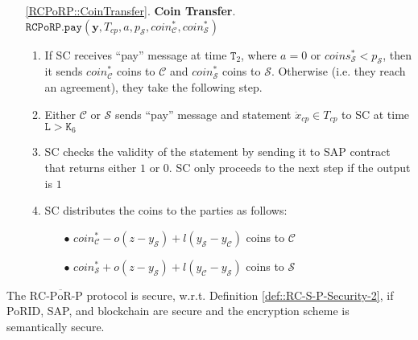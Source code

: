 \begin{enumerate}
\item[\ref{RCPoRP::CoinTransfer}.] \textbf{Coin Transfer}. \label{RCPoRP::CoinTransfer2} $\mathtt{\mathtt{RCPoRP}}.\mathtt{pay}(\bm{y},T_{\scriptscriptstyle cp},a,p_{\scriptscriptstyle\mathcal S}, coin^{\scriptscriptstyle *}_{\scriptscriptstyle\mathcal C},coin^{\scriptscriptstyle *}_{\scriptscriptstyle\mathcal S})$
\begin{enumerate}


 \item If SC  receives  ``pay'' message  at time $\texttt{T}_{\scriptscriptstyle 2}$, where $a=0$ or $coins^{\scriptscriptstyle *}_{\scriptscriptstyle\mathcal{S}}<p_{\scriptscriptstyle\mathcal{S}}$, then it sends $coin^{\scriptscriptstyle *}_{\scriptscriptstyle\mathcal C}$ coins to $\mathcal C$ and $coin^{\scriptscriptstyle *}_{\scriptscriptstyle\mathcal S}$ coins to $\mathcal S$. Otherwise (i.e. they reach an agreement), they take the following step. 

\item Either $\mathcal C$ or $\mathcal S$ sends ``pay'' message and  statement $\ddot{x}_{\scriptscriptstyle cp}\in T_{\scriptscriptstyle cp}$ to SC at time $\texttt{L}>\texttt{K}_{\scriptscriptstyle 6}$
\item SC checks the validity of the statement by sending it  to SAP contract that  returns  either $1$ or $0$. SC only proceeds to the next step if the output is $1$
\item SC distributes the coins to the parties as follows:

\begin{itemize}
\item[$\bullet$]   $coin^{\scriptscriptstyle *}_{\scriptscriptstyle\mathcal C}-o(z-y_{\scriptscriptstyle\mathcal S})+l(y_{\scriptscriptstyle\mathcal S}-y_{\scriptscriptstyle\mathcal C})$ coins  to $\mathcal C$

\item[$\bullet$] $coin^{\scriptscriptstyle *}_{\scriptscriptstyle\mathcal S}+o(z-y_{\scriptscriptstyle\mathcal S})+l( y_{\scriptscriptstyle\mathcal C}-y_{\scriptscriptstyle\mathcal S})$ coins to $\mathcal S$

 
\end{itemize}

\end{enumerate}
\end{enumerate}




\begin{theorem}
The ${\text{RC-}\overline{\text{PoR}}\text{-P}}$ protocol is secure, w.r.t. Definition \ref{def::RC-S-P-Security-2}, if PoRID, SAP, and blockchain are secure and the encryption scheme is semantically secure. 
\end{theorem}



